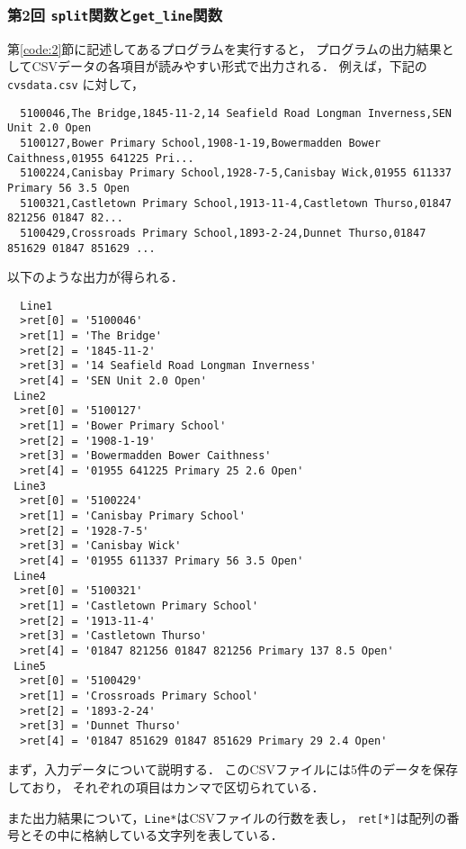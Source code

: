 \documentclass[autodetect-engine,dvi=dvipdfmx,ja=standard,
               a4j,11pt]{bxjsarticle}
\begin{document}
\subsubsection{第2回 \texttt{split}関数と\texttt{get\_line}関数}

第\ref{code:2}節に記述してあるプログラムを実行すると，
プログラムの出力結果としてCSVデータの各項目が読みやすい形式で出力される．
例えば，下記の \verb|cvsdata.csv| に対して，

{\fontsize{10pt}{11pt} \selectfont
 \begin{verbatim}
  5100046,The Bridge,1845-11-2,14 Seafield Road Longman Inverness,SEN Unit 2.0 Open
  5100127,Bower Primary School,1908-1-19,Bowermadden Bower Caithness,01955 641225 Pri...
  5100224,Canisbay Primary School,1928-7-5,Canisbay Wick,01955 611337 Primary 56 3.5 Open
  5100321,Castletown Primary School,1913-11-4,Castletown Thurso,01847 821256 01847 82...
  5100429,Crossroads Primary School,1893-2-24,Dunnet Thurso,01847 851629 01847 851629 ...
 \end{verbatim}
}

\noindent
以下のような出力が得られる．

{\fontsize{10pt}{11pt} \selectfont
 \begin{verbatim}
  Line1
  >ret[0] = '5100046'
  >ret[1] = 'The Bridge'
  >ret[2] = '1845-11-2'
  >ret[3] = '14 Seafield Road Longman Inverness'
  >ret[4] = 'SEN Unit 2.0 Open'
 Line2
  >ret[0] = '5100127'
  >ret[1] = 'Bower Primary School'
  >ret[2] = '1908-1-19'
  >ret[3] = 'Bowermadden Bower Caithness'
  >ret[4] = '01955 641225 Primary 25 2.6 Open'
 Line3
  >ret[0] = '5100224'
  >ret[1] = 'Canisbay Primary School'
  >ret[2] = '1928-7-5'
  >ret[3] = 'Canisbay Wick'
  >ret[4] = '01955 611337 Primary 56 3.5 Open'
 Line4
  >ret[0] = '5100321'
  >ret[1] = 'Castletown Primary School'
  >ret[2] = '1913-11-4'
  >ret[3] = 'Castletown Thurso'
  >ret[4] = '01847 821256 01847 821256 Primary 137 8.5 Open'
 Line5
  >ret[0] = '5100429'
  >ret[1] = 'Crossroads Primary School'
  >ret[2] = '1893-2-24'
  >ret[3] = 'Dunnet Thurso'
  >ret[4] = '01847 851629 01847 851629 Primary 29 2.4 Open'
 \end{verbatim}
}

まず，入力データについて説明する．
このCSVファイルには5件のデータを保存しており，
それぞれの項目はカンマで区切られている．

また出力結果について，\verb|Line*|はCSVファイルの行数を表し，
\verb|ret[*]|は配列の番号とその中に格納している文字列を表している．
\end{document}
